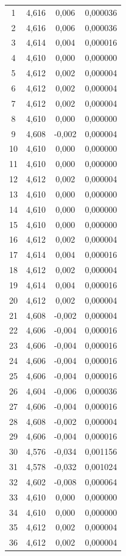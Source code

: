 \begin{longtable}{|c|c|c|c|}
1 & 4,616 & 0,006 & 0,000036 \\
2 & 4,616 & 0,006 & 0,000036 \\
3 & 4,614 & 0,004 & 0,000016 \\
4 & 4,610 & 0,000 & 0,000000 \\
5 & 4,612 & 0,002 & 0,000004 \\
6 & 4,612 & 0,002 & 0,000004 \\
7 & 4,612 & 0,002 & 0,000004 \\
8 & 4,610 & 0,000 & 0,000000 \\
9 & 4,608 & -0,002 & 0,000004 \\
10 & 4,610 & 0,000 & 0,000000 \\
11 & 4,610 & 0,000 & 0,000000 \\
12 & 4,612 & 0,002 & 0,000004 \\
13 & 4,610 & 0,000 & 0,000000 \\
14 & 4,610 & 0,000 & 0,000000 \\
15 & 4,610 & 0,000 & 0,000000 \\
16 & 4,612 & 0,002 & 0,000004 \\
17 & 4,614 & 0,004 & 0,000016 \\
18 & 4,612 & 0,002 & 0,000004 \\
19 & 4,614 & 0,004 & 0,000016 \\
20 & 4,612 & 0,002 & 0,000004 \\
21 & 4,608 & -0,002 & 0,000004 \\
22 & 4,606 & -0,004 & 0,000016 \\
23 & 4,606 & -0,004 & 0,000016 \\
24 & 4,606 & -0,004 & 0,000016 \\
25 & 4,606 & -0,004 & 0,000016 \\
26 & 4,604 & -0,006 & 0,000036 \\
27 & 4,606 & -0,004 & 0,000016 \\
28 & 4,608 & -0,002 & 0,000004 \\
29 & 4,606 & -0,004 & 0,000016 \\
30 & 4,576 & -0,034 & 0,001156 \\
31 & 4,578 & -0,032 & 0,001024 \\
32 & 4,602 & -0,008 & 0,000064 \\
33 & 4,610 & 0,000 & 0,000000 \\
34 & 4,610 & 0,000 & 0,000000 \\
35 & 4,612 & 0,002 & 0,000004 \\
36 & 4,612 & 0,002 & 0,000004 \\

\end{longtable}
